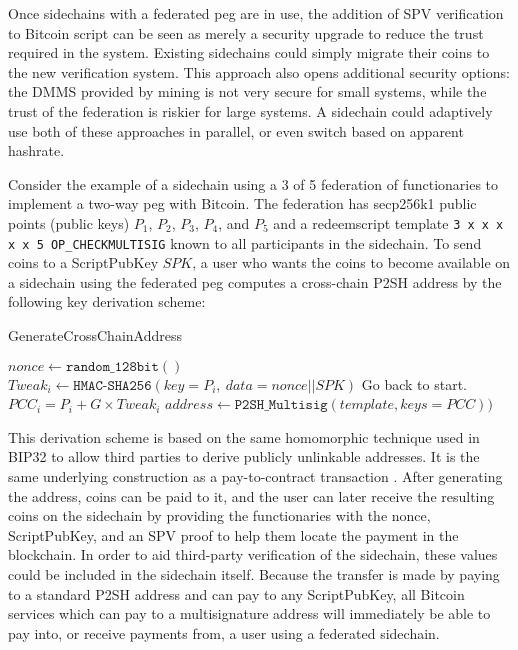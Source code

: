 \documentclass[letterpaper]{article}
\newcommand{\sidechain}{sidechain\xspace}
\newcommand{\hashsig}{DMMS\xspace}
\begin{document}
\begin{appendices}
Once sidechains with a federated peg are in use, the addition of SPV
verification to Bitcoin script can be seen as merely a security upgrade to reduce
the trust required in the system. Existing sidechains could simply migrate
their coins to the new verification system. This approach also opens
additional security options: the \hashsig
provided by mining is not very secure for small systems, while the trust
of the federation is riskier for large systems. A sidechain could adaptively
use both of these approaches in parallel, or even switch based on apparent
hashrate.

Consider the example of a sidechain using a 3 of 5 federation of
functionaries to implement a two-way peg with Bitcoin. The federation
has secp256k1 public points (public keys) $P_1$, $P_2$, $P_3$, $P_4$, and $P_5$ and a
redeemscript template \texttt{3 x x x x x 5 OP\_CHECKMULTISIG}
known to all participants in the sidechain. To send coins to a ScriptPubKey $SPK$,
a user who wants the coins to become available on a sidechain using the federated peg computes a cross-chain P2SH\cite{andresen2012-2} address by the following key derivation scheme:


\begin{algorithm}
\caption{GenerateCrossChainAddress}
\begin{algorithmic}[1]

  \State $nonce \gets \texttt{random\_128bit}()$
    \State $Tweak_i \gets \texttt{HMAC-SHA256}(key=P_i,~data=nonce || SPK)$
      \State Go back to start.
    \EndIf
    \State $PCC_i = P_i + G \times Tweak_i$
  \EndFor
  \State $address \gets \texttt{P2SH\_Multisig}(template, keys=PCC))$
\end{algorithmic}
\end{algorithm}
This derivation scheme is based on the same homomorphic technique \cite{maxwell2011}  used in BIP32 to allow third parties to derive publicly unlinkable addresses. It is the same underlying construction as a pay-to-contract transaction \cite{gerhardt+hanke2012}.
After generating the address, coins can be paid to it, and the user can later receive the resulting coins on the \sidechain by providing
the functionaries with the nonce, ScriptPubKey, and an SPV proof to help
them locate the payment in the blockchain. In order to aid third-party verification of the sidechain, these values could be included in the sidechain itself. Because the transfer is made by paying to a standard P2SH address and can pay to any ScriptPubKey, all Bitcoin services which can pay to a multisignature address will immediately be able to pay into, or receive payments from, a user using a federated sidechain.


\end{appendices}
\end{document}

